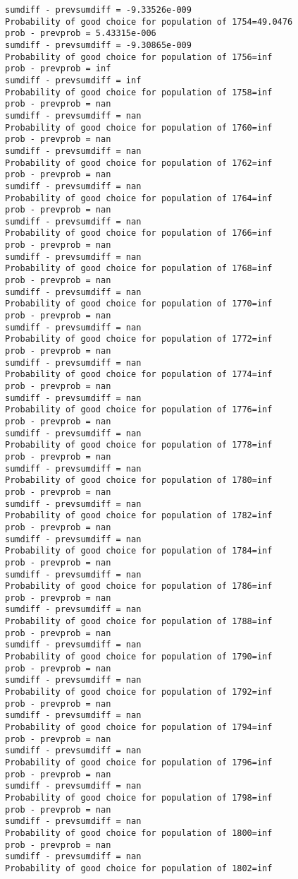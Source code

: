 \documentclass[11pt,onecolumn]{article}
\begin{document}
\begin{verbatim}
sumdiff - prevsumdiff = -9.33526e-009
Probability of good choice for population of 1754=49.0476
prob - prevprob = 5.43315e-006
sumdiff - prevsumdiff = -9.30865e-009
Probability of good choice for population of 1756=inf
prob - prevprob = inf
sumdiff - prevsumdiff = inf
Probability of good choice for population of 1758=inf
prob - prevprob = nan
sumdiff - prevsumdiff = nan
Probability of good choice for population of 1760=inf
prob - prevprob = nan
sumdiff - prevsumdiff = nan
Probability of good choice for population of 1762=inf
prob - prevprob = nan
sumdiff - prevsumdiff = nan
Probability of good choice for population of 1764=inf
prob - prevprob = nan
sumdiff - prevsumdiff = nan
Probability of good choice for population of 1766=inf
prob - prevprob = nan
sumdiff - prevsumdiff = nan
Probability of good choice for population of 1768=inf
prob - prevprob = nan
sumdiff - prevsumdiff = nan
Probability of good choice for population of 1770=inf
prob - prevprob = nan
sumdiff - prevsumdiff = nan
Probability of good choice for population of 1772=inf
prob - prevprob = nan
sumdiff - prevsumdiff = nan
Probability of good choice for population of 1774=inf
prob - prevprob = nan
sumdiff - prevsumdiff = nan
Probability of good choice for population of 1776=inf
prob - prevprob = nan
sumdiff - prevsumdiff = nan
Probability of good choice for population of 1778=inf
prob - prevprob = nan
sumdiff - prevsumdiff = nan
Probability of good choice for population of 1780=inf
prob - prevprob = nan
sumdiff - prevsumdiff = nan
Probability of good choice for population of 1782=inf
prob - prevprob = nan
sumdiff - prevsumdiff = nan
Probability of good choice for population of 1784=inf
prob - prevprob = nan
sumdiff - prevsumdiff = nan
Probability of good choice for population of 1786=inf
prob - prevprob = nan
sumdiff - prevsumdiff = nan
Probability of good choice for population of 1788=inf
prob - prevprob = nan
sumdiff - prevsumdiff = nan
Probability of good choice for population of 1790=inf
prob - prevprob = nan
sumdiff - prevsumdiff = nan
Probability of good choice for population of 1792=inf
prob - prevprob = nan
sumdiff - prevsumdiff = nan
Probability of good choice for population of 1794=inf
prob - prevprob = nan
sumdiff - prevsumdiff = nan
Probability of good choice for population of 1796=inf
prob - prevprob = nan
sumdiff - prevsumdiff = nan
Probability of good choice for population of 1798=inf
prob - prevprob = nan
sumdiff - prevsumdiff = nan
Probability of good choice for population of 1800=inf
prob - prevprob = nan
sumdiff - prevsumdiff = nan
Probability of good choice for population of 1802=inf

\end{verbatim}
\end{document}
